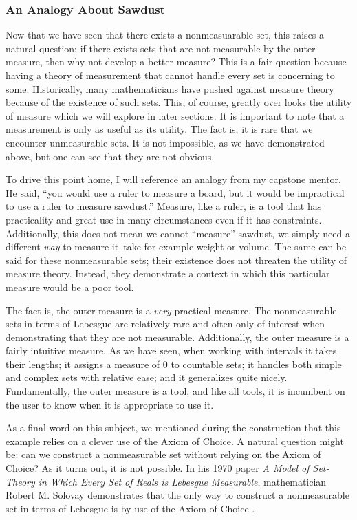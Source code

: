 \documentclass{article}
\theoremstyle{axiom} \newtheorem{axiom}{Axiom}
\theoremstyle{definition} \newtheorem{definition}{Definition}
\theoremstyle{example} \newtheorem{example}{Example}
\theoremstyle{proposition} \newtheorem{prop}{Proposition}
\theoremstyle{lemma} \newtheorem{lemma}{Lemma}
\begin{document}
\subsubsection{An Analogy About Sawdust}

Now that we have seen that there exists a nonmeasuarable set, this raises a 
natural question: if there exists sets that 
are not measurable by the outer measure, then why not develop a better measure? 
This is a fair question because having a theory of measurement that cannot handle every 
set is concerning to some. Historically, many mathematicians have pushed against measure theory
because of the existence of such sets. This, of course, greatly over
looks the utility of measure which we will explore in later sections. 
It is important to note that a measurement is only as useful as its utility. 
The fact is, it is rare that we encounter unmeasurable sets. It is not 
impossible, as we have demonstrated above, but one can see that they are not 
obvious. 

To drive this point home, I will reference an analogy from my capstone
mentor. He said, ``you would use a ruler to measure a board, but it would be 
impractical to use a ruler to measure sawdust.'' Measure, like a ruler, is a 
tool that has practicality and great use in many circumstances even if it has 
constraints. Additionally, this does not mean we cannot ``measure'' sawdust, we 
simply need a different \textit{way} to measure it--take for example weight or 
volume. The same can be said for these nonmeasurable sets; their existence does 
not threaten the utility of measure theory. Instead, they demonstrate a context 
in which this particular measure would be a poor tool. 

The fact is, the outer measure is a \textit{very} practical measure. The
nonmeasurable sets in terms of Lebesgue are relatively rare and often only of
interest when demonstrating that they are not measurable. Additionally, the 
outer measure is a fairly intuitive measure. As we have seen, when working with
intervals it takes their lengths; it assigns a measure of $0$ to countable 
sets; it handles both simple and complex sets with relative ease; and it 
generalizes quite nicely. Fundamentally, the outer measure is a tool, and like 
all tools, it is incumbent on the user to know when it is appropriate to use it.

As a final word on this subject, we mentioned during the construction that this 
example relies on a clever use of the Axiom of Choice. A natural question might 
be: can we construct a nonmeasurable set without relying on the Axiom of Choice? 
As it turns out, it is not possible. In his 1970 paper 
\textit{A Model of Set-Theory in Which Every Set of Reals is 
Lebesgue Measurable}, mathematician Robert M. Solovay demonstrates that the only 
way to construct a nonmeasurable set in terms of Lebesgue is by use of the 
Axiom of Choice \cite{solovay:1970}. 
\end{document}
